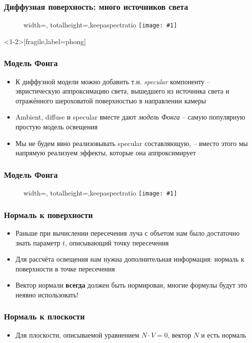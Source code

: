 \documentclass[10pt]{beamer}
\newcommand{\slideimage}[1]{
  \begin{figure}
    \begin{adjustbox}{width=\textwidth, totalheight=\textheight-2\baselineskip-2\baselineskip,keepaspectratio}
      \texttt{[image: \#1]}
    \end{adjustbox}
  \end{figure}
}
\begin{document}
\begin{frame}[fragile]
\frametitle{Диффузная поверхность: много источников света}
\slideimage{many_lights.png}
\end{frame}

\begin{frame}<1-2>[fragile,label=phong]
\frametitle{Модель Фонга}
\begin{itemize}
\item К диффузной модели можно добавить т.н. \textit{specular} компоненту -- эвристическую аппроксимацию света, вышедшего из источника света и отражённого шероховатой поверхностью в направлении камеры
\pause
\item Ambient, diffuse и specular вместе дают \textit{модель Фонга} -- самую популярную простую модель освещения
\pause
\item Мы не будем явно реализовывать specular составляющую, -- вместо этого мы напрямую реализуем эффекты, которые она аппроксимирует
\end{itemize}
\end{frame}

\begin{frame}[fragile]
\frametitle{Модель Фонга}
\slideimage{phong.png}
\end{frame}









\begin{frame}[fragile]
\frametitle{Нормаль к поверхности}
\begin{itemize}
\item Раньше при вычислении пересечения луча с объетом нам было достаточно знать параметр \begin{math}t\end{math}, описывающий точку пересечения
\pause
\item Для рассчёта освещения нам нужна дополнительная информация: нормаль к поверхности в точке пересечения
\pause
\item Вектор нормали \textbf{всегда} должен быть нормирован, многие формулы будут это неявно использовать!
\end{itemize}
\end{frame}

\begin{frame}[fragile]
\frametitle{Нормаль к плоскости}
\begin{itemize}
\item Для плоскости, описываемой уравнением \begin{math}N\cdot V=0\end{math}, вектор \begin{math}N\end{math} и есть нормаль
\end{itemize}
\end{frame}
\end{document}
